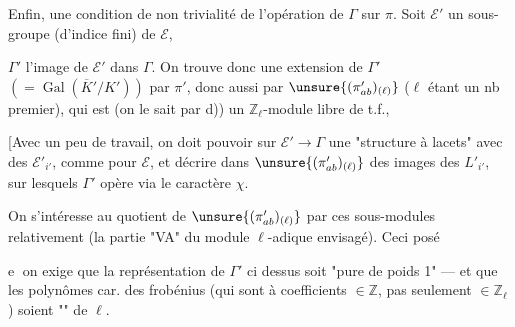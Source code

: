  Enfin,  une condition
 de non trivialité de l'opération de \(\Gamma\) sur \(\pi\).
Soit \(\mathcal E'\) un sous-groupe 
(d'indice fini) de \(\mathcal E\),



\(\Gamma'\) l'image de \(\mathcal E'\) dans \(\Gamma\). On trouve donc une
extension de \(\Gamma'\) \((=\operatorname{Gal}(\overline K'/K'))\) par \(\pi'\),
donc aussi par \(\unsure{(\pi'_{ab})_{(\ell)}}\)
(\(\ell\) étant un nb premier), qui est (on le sait par d)) un
\(\mathbb Z_\ell\)-module libre de t.f.,

[Avec un peu de travail, on doit pouvoir  sur
\(\mathcal E'\to\Gamma\) une "structure à lacets" avec des
\(\mathcal E'_{i'}\), comme pour \(\mathcal E\), et décrire dans
\(\unsure{(\pi'_{ab})_{(\ell)}}\)
 des images des  \(L'_{i'}\),
sur lesquels \(\Gamma'\) opère  via le caractère \(\chi\).


On s'intéresse au quotient de \(\unsure{(\pi'_{ab})_{(\ell)}}\) par ces
sous-modules relativement  (la partie "VA" du
module \(\ell\)-adique envisagé). Ceci posé

\textcircled{e} on exige que la représentation de \(\Gamma'\) ci dessus soit
"pure de poids 1" ---  et que les polynômes car.
des frobénius (qui sont à coefficients \(\in\mathbb Z\), pas seulement
\(\in\mathbb Z_\ell\)) soient "" de \(\ell\).


